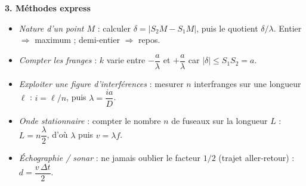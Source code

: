 \documentclass[11pt]{article}
\begin{document}
\begin{bilan}
\textbf{3. Méthodes express}
\begin{itemize}
  \item \emph{Nature d'un point $M$} : calculer $\delta = |S_2M - S_1M|$, puis le quotient $\delta/\lambda$. Entier $\Rightarrow$ maximum ; demi-entier $\Rightarrow$ repos.
  \item \emph{Compter les franges} : $k$ varie entre $-\dfrac{a}{\lambda}$ et $+\dfrac{a}{\lambda}$ car $|\delta|\le S_1S_2=a$.
  \item \emph{Exploiter une figure d'interférences} : mesurer $n$ interfranges sur une longueur $\ell$ : $i=\ell/n$, puis $\lambda = \dfrac{ia}{D}$.
  \item \emph{Onde stationnaire} : compter le nombre $n$ de fuseaux sur la longueur $L$ : $L=n\dfrac{\lambda}{2}$, d'où $\lambda$ puis $v=\lambda f$.
  \item \emph{Échographie / sonar} : ne jamais oublier le facteur $1/2$ (trajet aller-retour) : $d=\dfrac{v\,\Delta t}{2}$.
\end{itemize}
\end{bilan}
\end{document}
